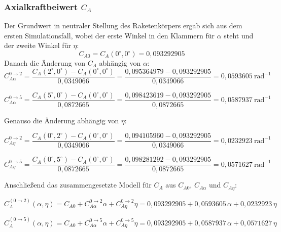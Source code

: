 \subsubsection*{Axialkraftbeiwert $C_A$}
\label{subsubsec:c_a_calculation}
Der Grundwert in neutraler Stellung des Raketenkörpers ergab sich aus dem ersten Simulationsfall, wobei der erste Winkel in den Klammern für $\alpha$ steht und der zweite Winkel für $\eta$:
\[
C_{A0} = C_A(0^\circ,0^\circ) = 0{,}093292905
\]
Danach die Änderung von $C_A$ abhängig von $\alpha$:
\begin{equation}
C_{A\alpha}^{0\to2}
= \frac{C_A(2^\circ,0^\circ)-C_A(0^\circ,0^\circ)}{0{,}0349066}
= \frac{0{,}095364979-0{,}093292905}{0{,}0349066}
= 0{,}0593605\ \mathrm{rad^{-1}}
\end{equation}

\begin{equation}
C_{A\alpha}^{0\to5}
= \frac{C_A(5^\circ,0^\circ)-C_A(0^\circ,0^\circ)}{0{,}0872665}
= \frac{0{,}098423619-0{,}093292905}{0{,}0872665}
= 0{,}0587937\ \mathrm{rad^{-1}}
\end{equation}

Genauso die Änderung abhängig von $\eta$:

\begin{equation}
C_{A\eta}^{0\to2}
= \frac{C_A(0^\circ,2^\circ)-C_A(0^\circ,0^\circ)}{0{,}0349066}
= \frac{0{,}094105960-0{,}093292905}{0{,}0349066}
= 0{,}0232923\ \mathrm{rad^{-1}}
\end{equation}

\begin{equation}
C_{A\eta}^{0\to5}
= \frac{C_A(0^\circ,5^\circ)-C_A(0^\circ,0^\circ)}{0{,}0872665}
= \frac{0{,}098281292-0{,}093292905}{0{,}0872665}
= 0{,}0571627\ \mathrm{rad^{-1}}
\end{equation}

Anschließend das zusammengesetzte Modell für $C_A$ aus $C_{A0}$, $C_{A\alpha}$ und $C_{A\eta}$:

\begin{equation}
C_A^{(0\to2)}(\alpha,\eta)
= C_{A0} + C_{A\alpha}^{0\to2}\alpha + C_{A\eta}^{0\to2}\eta
= 0{,}093292905 + 0{,}0593605\,\alpha + 0{,}0232923\,\eta
\end{equation}

\begin{equation}
C_A^{(0\to5)}(\alpha,\eta)
= C_{A0} + C_{A\alpha}^{0\to5}\alpha + C_{A\eta}^{0\to5}\eta
= 0{,}093292905 + 0{,}0587937\,\alpha + 0{,}0571627\,\eta
\end{equation}

